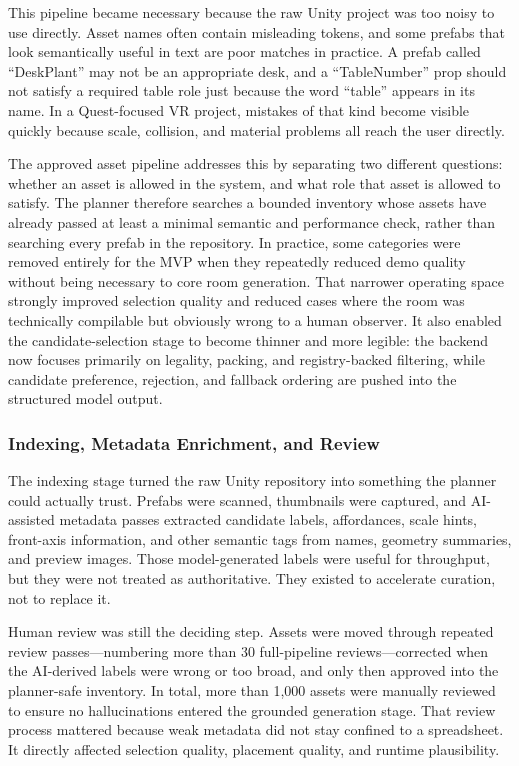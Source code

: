 \documentclass[12pt]{article}
\begin{document}
This pipeline became necessary because the raw Unity project was too noisy to use directly. Asset names often contain misleading tokens, and some prefabs that look semantically useful in text are poor matches in practice. A prefab called ``DeskPlant'' may not be an appropriate desk, and a ``TableNumber'' prop should not satisfy a required table role just because the word ``table'' appears in its name. In a Quest-focused VR project, mistakes of that kind become visible quickly because scale, collision, and material problems all reach the user directly.

The approved asset pipeline addresses this by separating two different questions: whether an asset is allowed in the system, and what role that asset is allowed to satisfy. The planner therefore searches a bounded inventory whose assets have already passed at least a minimal semantic and performance check, rather than searching every prefab in the repository. In practice, some categories were removed entirely for the MVP when they repeatedly reduced demo quality without being necessary to core room generation. That narrower operating space strongly improved selection quality and reduced cases where the room was technically compilable but obviously wrong to a human observer. It also enabled the candidate-selection stage to become thinner and more legible: the backend now focuses primarily on legality, packing, and registry-backed filtering, while candidate preference, rejection, and fallback ordering are pushed into the structured model output.

\subsubsection{Indexing, Metadata Enrichment, and Review}
The indexing stage turned the raw Unity repository into something the planner could actually trust. Prefabs were scanned, thumbnails were captured, and AI-assisted metadata passes extracted candidate labels, affordances, scale hints, front-axis information, and other semantic tags from names, geometry summaries, and preview images. Those model-generated labels were useful for throughput, but they were not treated as authoritative. They existed to accelerate curation, not to replace it.

Human review was still the deciding step. Assets were moved through repeated review passes---numbering more than 30 full-pipeline reviews---corrected when the AI-derived labels were wrong or too broad, and only then approved into the planner-safe inventory. In total, more than 1{,}000 assets were manually reviewed to ensure no hallucinations entered the grounded generation stage. That review process mattered because weak metadata did not stay confined to a spreadsheet. It directly affected selection quality, placement quality, and runtime plausibility.
\end{document}

